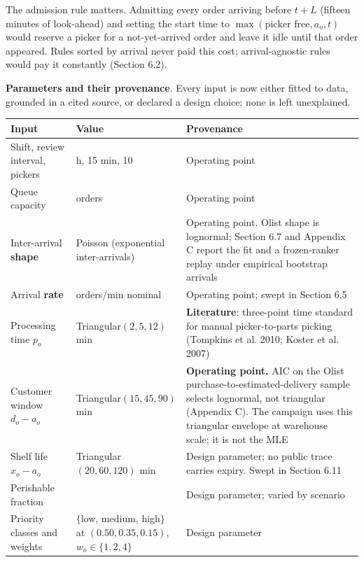 \documentclass[review,3p,times]{elsarticle}
\newcounter{none}
\theoremstyle{definition}
\begin{document}
The admission rule matters. Admitting every order arriving before
\(t+L\) (fifteen minutes of look-ahead) and setting the start time to
\(\max(\text{picker free}, a_o, t)\) would reserve a picker for a
not-yet-arrived order and leave it idle until that order appeared. Rules
sorted by arrival never paid this cost; arrival-agnostic rules would pay
it constantly (Section 6.2).

\textbf{Parameters and their provenance}. Every input is now either
fitted to data, grounded in a cited source, or declared a design choice;
none is left unexplained.

{\def\LTcaptype{none} %
\begin{longtable}[]{@{}
  >{\raggedright\arraybackslash}p{}
  >{\raggedright\arraybackslash}p{}
  >{\raggedright\arraybackslash}p{}@{}}
\toprule\noalign{}
\begin{minipage}[b]{\linewidth}\raggedright
Input
\end{minipage} & \begin{minipage}[b]{\linewidth}\raggedright
Value
\end{minipage} & \begin{minipage}[b]{\linewidth}\raggedright
Provenance
\end{minipage} \\
\midrule\noalign{}
\endhead
\bottomrule\noalign{}
\endlastfoot
Shift, review interval, pickers & 8 h, 15 min, 10 & Operating point \\
Queue capacity & 200 orders & Operating point \\
Inter-arrival \textbf{shape} & Poisson (exponential inter-arrivals) &
Operating point. Olist shape is lognormal; Section 6.7 and Appendix C
report the fit and a frozen-ranker replay under empirical bootstrap
arrivals \\
Arrival \textbf{rate} & 1.65 orders/min nominal & Operating point; swept
in Section 6.5 \\
Processing time \(p_o\) & Triangular\((2, 5, 12)\) min &
\textbf{Literature}: three-point time standard for manual
picker-to-parts picking (Tompkins et al. 2010; Koster et al. 2007) \\
Customer window \(d_o - a_o\) & Triangular\((15, 45, 90)\) min &
\textbf{Operating point.} AIC on the Olist
purchase-to-estimated-delivery sample selects lognormal, not triangular
(Appendix C). The campaign uses this triangular envelope at warehouse
scale; it is not the MLE \\
Shelf life \(x_o - a_o\) & Triangular\((20, 60, 120)\) min & Design
parameter; no public trace carries expiry. Swept in Section 6.11 \\
Perishable fraction & 0.20 & Design parameter; varied by scenario \\
Priority classes and weights & \(\{\)low, medium, high\(\}\) at
\((0.50, 0.35, 0.15)\), \(w_o \in \{1, 2, 4\}\) & Design parameter \\
\end{longtable}
}
\end{document}
